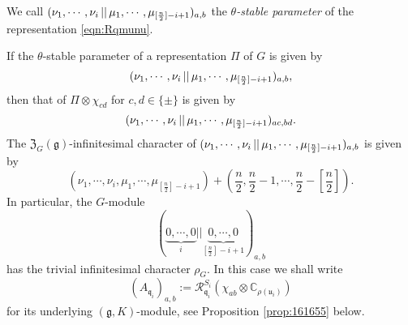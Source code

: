 \begin{definition}
\label{def:thetapara}
We call $({\nu_1, \cdots, \nu_i}\,||\,{\mu_1, \cdots, \mu_{[\frac n 2]-i+1}})_{a, b}$
 the 
{\it{$\theta$-stable parameter}}
 of the representation \eqref{eqn:Rqmunu}.  
\end{definition}



If the $\theta$-stable parameter 
 of a representation $\Pi$ of $G$ is given by 
\[
   ({\nu_1, \cdots, \nu_i}\,||\,{\mu_1, \cdots, \mu_{[\frac n 2]-i+1}})_{a, b}, 
\]
 then that of $\Pi \otimes \chi_{c d}$ for $c, d \in \{\pm\}$ is given by
\begin{equation}
\label{eqn:thetatensor}
({\nu_1, \cdots, \nu_i}\,||\,{\mu_1, \cdots, \mu_{[\frac n 2]-i+1}})_{ac,bd}.
\end{equation}
The 
${\mathfrak{Z}}_G({\mathfrak {g}})$-infinitesimal character
 of $({\nu_1, \cdots, \nu_i}\,||\,{\mu_1, \cdots, \mu_{[\frac n 2]-i+1}})_{a, b}$
 is given by
\[
  (\nu_1, \cdots, \nu_i, \mu_1, \cdots, \mu_{[\frac n 2]-i+1})
+
  (\frac n 2, \frac n 2-1, \cdots, \frac n 2-[\frac n 2]).  
\]
In particular,
 the $G$-module 
\[
  (\underbrace{0, \cdots,0}_{i} || \underbrace{0, \cdots,0}_{[\frac n 2]-i+1})_{a, b}
\]
has the trivial infinitesimal character $\rho_G$.  
In this case
 we shall write 
\begin{equation}
\label{eqn:AqRq}
   (A_{\mathfrak{q}_i})_{a, b}
   :={\mathcal{R}}_{\mathfrak{q}_i}^{S_i}(\chi_{ab}\otimes {\mathbb{C}}_{\rho({\mathfrak{u}}_i)})
\end{equation}
 for its underlying $({\mathfrak{g}},K)$-module, 
 see Proposition \ref{prop:161655} below.  



